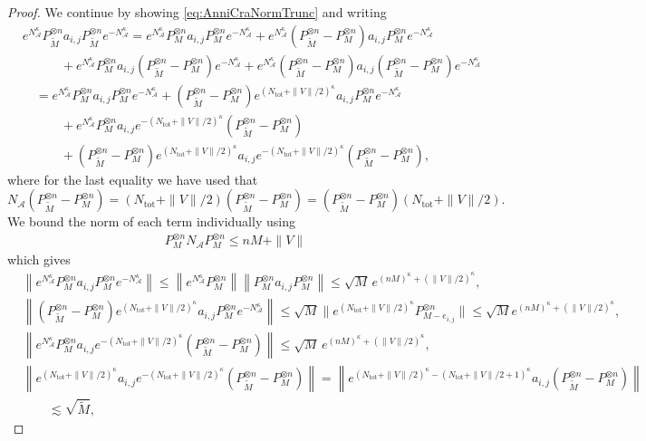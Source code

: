 \documentclass[11pt]{amsart}
\newcommand{\1}{\mathbbm{1}}
\newcommand{\NA}{N_{\mathcal{A}}}
\newcommand{\Ntot}{N_{\operatorname{tot}}}
\theoremstyle{plain}
\theoremstyle{definition}
\theoremstyle{remark}
\numberwithin{equation}{section}
\begin{document}
\begin{proof}
We continue by showing \eqref{eq:AnniCraNormTrunc} and writing
\[\begin{split}
&e^{N_{\mathcal A}^\kappa}P_{\widetilde M}^{\otimes n}a_{i,j} P_{\widetilde M}^{\otimes n}e^{-N_{\mathcal A}^\kappa}= e^{\NA^{\kappa}}P_{M}^{\otimes n}a_{i,j}P_{M}^{\otimes n}e^{-\NA^{\kappa}} +e^{\NA^{\kappa}}(P_{\widetilde M}^{\otimes n}-P_{M}^{\otimes n})a_{i,j} P_{M}^{\otimes n}e^{-\NA^{\kappa}} \\&\qquad\quad+ e^{\NA^{\kappa}}P^{\otimes n}_{M}a_{i,j} (P^{\otimes n}_{\widetilde M}-P_{M}^{\otimes n})e^{-\NA^{\kappa}} + e^{\NA^{\kappa}}(P^{\otimes n}_{\widetilde M}-P^{\otimes n}_{M})a_{i,j} (P^{\otimes n}_{\widetilde M}-P_{M}^{\otimes n})e^{-\NA^{\kappa}}\\&\quad= e^{\NA^{\kappa}}P_{M}^{\otimes n}a_{i,j}P_{M}^{\otimes n}e^{-\NA^{\kappa}} +(P_{\widetilde M}^{\otimes n}-P_{M}^{\otimes n})e^{(\Ntot + \|V\|/2)^{\kappa}}a_{i,j} P_{M}^{\otimes n}e^{-\NA^{\kappa}} \\&\qquad\quad+ e^{\NA^{\kappa}}P^{\otimes n}_{M}a_{i,j} e^{-(\Ntot + \|V\|/2)^{\kappa}}(P^{\otimes n}_{\widetilde M}-P_{M}^{\otimes n}) \\&\qquad\quad+ (P^{\otimes n}_{\widetilde M}-P^{\otimes n}_{M})e^{(\Ntot + \|V\|/2)^{\kappa}} a_{i,j} e^{-(\Ntot + \|V\|/2)^{\kappa}}  (P^{\otimes n}_{\widetilde M}-P_{M}^{\otimes n}),
\end{split}
\]
where for the last equality we have used that $\NA(P^{\otimes n}_{\widetilde M} - P^{\otimes n}_{M}) = (\Ntot + \|V\|/2)(P^{\otimes n}_{\widetilde M} - P^{\otimes n}_{M})= (P^{\otimes n}_{\widetilde M} - P^{\otimes n}_{M})(\Ntot + \|V\|/2).$ We bound the norm of each term individually using
\begin{align*}
P^{\otimes n}_{M}\NA P^{\otimes n}_{M} \le nM +\|V\|
\end{align*}
which gives 
\begin{align*}
&\left\|e^{\NA^{\kappa}}P_{M}^{\otimes n}a_{i,j}P_{M}^{\otimes n}e^{-\NA^{\kappa}}\right\| \le \left\|e^{\NA^{\kappa}}P_{M}^{\otimes n}\right\|\left\|P_{M}^{\otimes n}a_{i,j}P_{M}^{\otimes n}\right\| \le \sqrt{M} \,e^{(nM)^\kappa + (\|V\|/2)^\kappa},\\
&\left\|(P_{\widetilde M}^{\otimes n}-P_{M}^{\otimes n})e^{(\Ntot + \|V\|/2)^{\kappa}}a_{i,j} P_{M}^{\otimes n}e^{-\NA^{\kappa}}\right\| \le \sqrt{M}   \| e^{(\Ntot + \|V\|/2)^{\kappa}}P^{\otimes n}_{M - e_{i,j}}\| \le \sqrt{M} e^{(nM)^\kappa + (\|V\|/2)^{\kappa}},\\&\left\|
e^{\NA^{\kappa}}P^{\otimes n}_{M}a_{i,j} e^{-(\Ntot + \|V\|/2)^{\kappa}}(P^{\otimes n}_{\widetilde M}-P_{M}^{\otimes n})\right\| \le \sqrt{M}\, e^{(nM)^\kappa  +(\|V\|/2)^\kappa},\\ &\left\| e^{(\Ntot + \|V\|/2)^{\kappa}} a_{i,j} e^{-(\Ntot + \|V\|/2)^{\kappa}}  (P^{\otimes n}_{\widetilde M}-P_{M}^{\otimes n})\right\| =\left\| e^{(\Ntot + \|V\|/2)^{\kappa} -(\Ntot + \|V\|/2+1)^{\kappa}} a_{i,j}   (P^{\otimes n}_{\widetilde M}-P_{M}^{\otimes n})\right\|\\&\qquad\lesssim \sqrt{\widetilde M},

\end{align*}
\end{proof}
\end{document}
